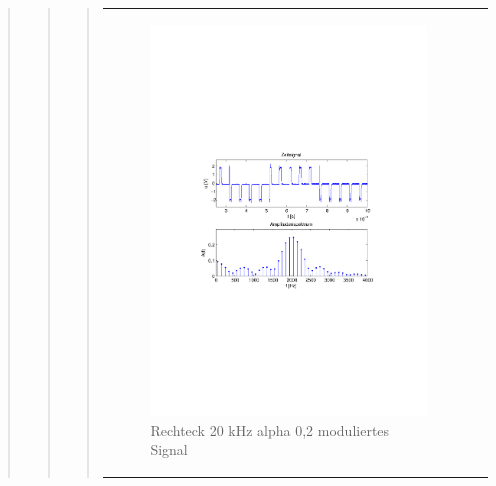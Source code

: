 \begin{quote}
\begin{quote}
\begin{quote}
\begin{center}
\begin{tabular}{ll}
            \hspace{-5cm}
                \begin{minipage}{0.6\textwidth}
                    \begin{figure}[H]
                        \includegraphics[scale=0.7, trim = 35mm 100mm 35mm 95mm, clip]{Bilder/flatrec20_02abget_zeit}
                          \caption{Rechteck 20 kHz alpha 0,2 moduliertes Signal}
		                  \label{fig:flatrec20_02zeit}
                    \end{figure}
                \end{minipage}
                

\end{tabular}
\end{center}
\end{quote}
\end{quote}
\end{quote}
